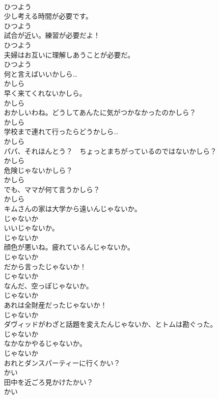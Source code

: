 \documentclass[8pt]{extreport}
\begin{document}
\begin{CJK}{UTF8}{min}
\\	ひつよう
\\	少し考える時間が必要です。	
\\	ひつよう
\\	試合が近い。練習が必要だよ！	
\\	ひつよう
\\	夫婦はお互いに理解しあうことが必要だ。	
\\	ひつよう
\\	何と言えばいいかしら…	
\\	かしら
\\	早く来てくれないかしら。	
\\	かしら
\\	おかしいわね。どうしてあんたに気がつかなかったのかしら？	
\\	かしら
\\	学校まで連れて行ったらどうかしら…	
\\	かしら
\\	パパ、それほんとう？　ちょっとまちがっているのではないかしら？	
\\	かしら
\\	危険じゃないかしら？	
\\	かしら
\\	でも、ママが何て言うかしら？	
\\	かしら
\\	キムさんの家は大学から遠いんじゃないか。	
\\	じゃないか
\\	いいじゃないか。	
\\	じゃないか
\\	顔色が悪いね。疲れているんじゃないか。	
\\	じゃないか
\\	だから言ったじゃないか！	
\\	じゃないか
\\	なんだ、空っぽじゃないか。	
\\	じゃないか
\\	あれは全財産だったじゃないか！	
\\	じゃないか
\\	ダヴィッドがわざと話題を変えたんじゃないか、とトムは勘ぐった。	
\\	じゃないか
\\	なかなかやるじゃないか。	
\\	じゃないか
\\	おれとダンスパーティーに行くかい？	
\\	かい
\\	田中を近ごろ見かけたかい？	
\\	かい

\end{CJK}
\end{document}
